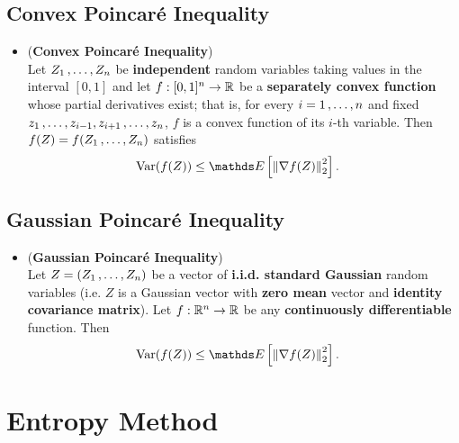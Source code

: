 \documentclass[11pt]{article}
\begin{document}
\subsection{Convex Poincar{\'e} Inequality}
\begin{itemize}
\item \begin{theorem} (\textbf{Convex Poincar{\'e} Inequality}) \citep{boucheron2013concentration} \\
Let $Z_1 \,{,}\ldots{,}\, Z_n$ be \textbf{independent} random variables taking values in the interval $[0, 1]$ and let $f : [0, 1]^n \to {\mathbb R}$ be a \textbf{separately convex function} whose partial derivatives exist; that is, for every $i = 1 \,{,}\ldots{,}\, n$ and fixed $z_1 \,{,}\ldots{,}\, z_{i-1}, z_{i+1} \,{,}\ldots{,}\, z_n$,  $f$ is a convex function of its $i$-th variable. Then $f(Z) = f(Z_1 \,{,}\ldots{,}\, Z_n)$ satisfies
\begin{align}
\text{Var}(f(Z)) &\le \E{}{\norm{\nabla f(Z)}{2}^2}. \label{ineqn: convex_poincare_inequality}
\end{align}
\end{theorem}
\end{itemize}
\subsection{Gaussian Poincar{\'e} Inequality}
\begin{itemize}
\item \begin{theorem} (\textbf{Gaussian Poincar{\'e} Inequality}) \citep{boucheron2013concentration} \\
Let $Z = (Z_1 \,{,}\ldots{,}\, Z_n)$ be a vector of \textbf{i.i.d. standard Gaussian} random variables (i.e. $Z$ is a Gaussian vector with \textbf{zero mean} vector and \textbf{identity covariance matrix}). Let $f : {\mathbb R}^n \to {\mathbb R}$ be any \textbf{continuously differentiable} function. Then
\begin{align}
\text{Var}(f(Z)) &\le \E{}{\norm{\nabla f(Z)}{2}^2}. \label{ineqn: gaussian_poincare_inequality}
\end{align}
\end{theorem}
\end{itemize}


\section{Entropy Method}
\end{document}
